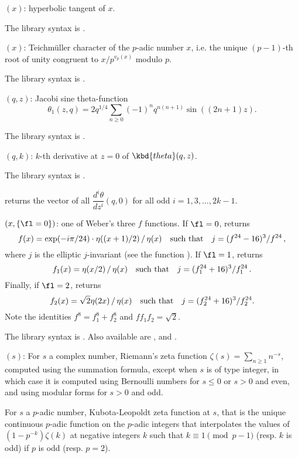 $(x)$: \label{se:tanh}hyperbolic tangent of $x$.

The library syntax is .

$(x)$: \label{se:teichmuller}Teichm\"uller character of the $p$-adic number $x$, i.e. the unique
$(p-1)$-th root of unity congruent to $x / p^{v_p(x)}$ modulo $p$.

The library syntax is .

$(q,z)$: \label{se:theta}Jacobi sine theta-function
$$ \theta_1(z, q) = 2q^{1/4} \sum_{n\geq 0} (-1)^n q^{n(n+1)} \sin((2n+1)z).$$

The library syntax is .

$(q,k)$: \label{se:thetanullk}$k$-th derivative at $z=0$ of $\kbd{theta}(q,z)$.

The library syntax is .

 returns the vector
of all $\dfrac{d^i\theta}{dz^i}(q,0)$ for all odd $i = 1, 3, \dots, 2k-1$.

$(x,\{\fl=0\})$: \label{se:weber}one of Weber's three $f$ functions.
If $\fl=0$, returns
$$f(x)=\exp(-i\pi/24)\cdot\eta((x+1)/2)\,/\,\eta(x) \quad\hbox{such that}\quad
j=(f^{24}-16)^3/f^{24}\,,$$
where $j$ is the elliptic $j$-invariant  (see the function ).
If $\fl=1$, returns
$$f_1(x)=\eta(x/2)\,/\,\eta(x)\quad\hbox{such that}\quad
j=(f_1^{24}+16)^3/f_1^{24}\,.$$
Finally, if $\fl=2$, returns
$$f_2(x)=\sqrt{2}\eta(2x)\,/\,\eta(x)\quad\hbox{such that}\quad
j=(f_2^{24}+16)^3/f_2^{24}.$$
Note the identities $f^8=f_1^8+f_2^8$ and $ff_1f_2=\sqrt2$.

The library syntax is .
Also available are ,
 and .

$(s)$: \label{se:zeta}For $s$ a complex number, Riemann's zeta
function  $\zeta(s)=\sum_{n\ge1}n^{-s}$,
computed using the  summation formula, except
when $s$ is of type integer, in which case it is computed using
Bernoulli numbers for $s\le0$ or $s>0$ and
even, and using modular forms for $s>0$ and odd.

For $s$ a $p$-adic number, Kubota-Leopoldt zeta function at $s$, that
is the unique continuous $p$-adic function on the $p$-adic integers
that interpolates the values of $(1 - p^{-k}) \zeta(k)$ at negative
integers $k$ such that $k \equiv 1 \pmod{p-1}$ (resp. $k$ is odd) if
$p$ is odd (resp. $p = 2$).

